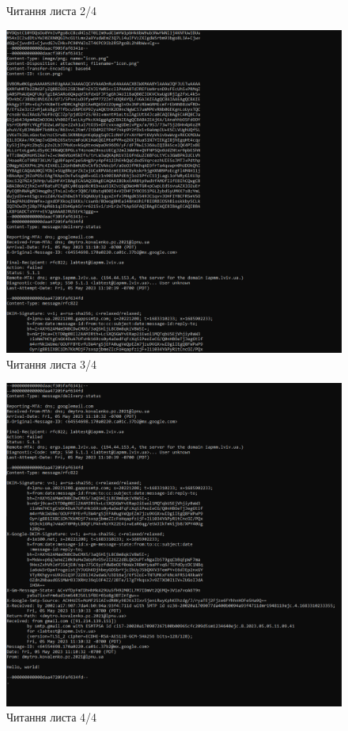 \documentclass{article}
\begin{document}
\begin{normalsize}
\begin{figure}[H]
	\caption{Читання листа 2/4}
\end{figure}
\begin{figure}[H]
	\centering
	\includegraphics[width=\textwidth]{25}
	\caption{Читання листа 3/4}
\end{figure}
\begin{figure}[H]
	\centering
	\includegraphics[width=\textwidth]{26}
	\caption{Читання листа 4/4}
\end{figure}


\end{normalsize}
\end{document}
